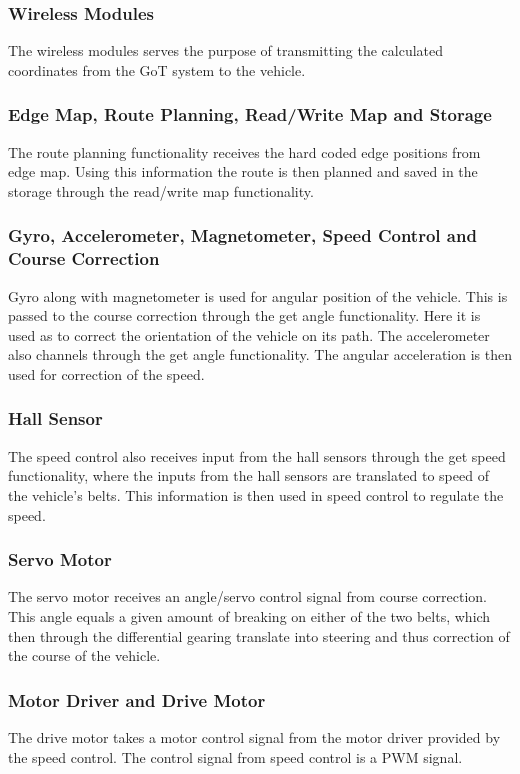 \subsubsection{Wireless Modules}
The wireless modules serves the purpose of transmitting the calculated coordinates from the GoT system to the vehicle.

\subsubsection{Edge Map, Route Planning, Read/Write Map and Storage}
The route planning functionality receives the hard coded edge positions from edge map. Using this information the route is then planned and saved in the storage through the read/write map functionality.

\subsubsection{Gyro, Accelerometer, Magnetometer, Speed Control and Course Correction}
Gyro along with magnetometer is used for angular position of the vehicle. This is passed to the course correction through the get angle functionality. Here it is used as to correct the orientation of the vehicle on its path. The accelerometer also channels through the get angle functionality. The angular acceleration is then used for correction of the speed.

\subsubsection{Hall Sensor}
The speed control also receives input from the hall sensors through the get speed functionality, where the inputs from the hall sensors are translated to speed of the vehicle's belts. This information is then used in speed control to regulate the speed.

\subsubsection{Servo Motor}
The servo motor receives an angle/servo control signal from course correction. This angle equals a given amount of breaking on either of the two belts, which then through the differential gearing translate into steering and thus correction of the course of the vehicle.

\subsubsection{Motor Driver and Drive Motor}
The drive motor takes a motor control signal from the motor driver provided by the speed control. The control signal from speed control is a PWM signal.

